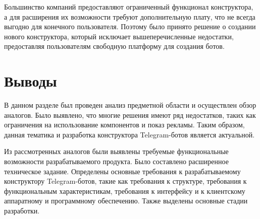 Большинство компаний предоставляют ограниченный
функционал конструктора, а для расширения их возможности требуют дополнительную
плату, что не всегда выгодно для конечного пользователя.
Поэтому было принято решение о создании нового конструктора, который исключает
вышеперечисленные недостатки, предоставляя пользователям свободную платформу для
создания ботов.





\section*{Выводы}

В данном разделе был проведен анализ предметной области и осуществлен обзор аналогов.
Было выявлено, что многие решения имеют ряд недостатков,
таких как ограничения на использование компонентов и показ рекламы.
Таким образом, данная тематика
и разработка конструктора Telegram-ботов является актуальной.

Из рассмотренных аналогов были выявлены требуемые
функциональные возможности разрабатываемого продукта.
Было составлено расширенное техническое задание.
Определены основные требования к разрабатываемому конструктору Telegram-ботов, такие как
требования к структуре, требования к функциональным характеристикам,
требования к интерфейсу и к
клиентскому аппаратному и программному обеспечению.
Также выделены основные стадии разработки.


